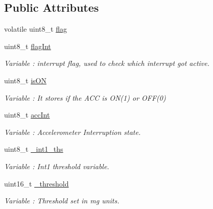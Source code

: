 \subsection*{Public Attributes}
\begin{DoxyCompactItemize}
\item 
volatile uint8\+\_\+t \hyperlink{class_wasp_a_c_c_a68bd866582dd3a6cffb18c806b22b5de}{flag}
\item 
uint8\+\_\+t \hyperlink{class_wasp_a_c_c_a6ce4e7806e8476ae6b71c93664676667}{flag\+Int}
\begin{DoxyCompactList}\small\item\em Variable \+: interrupt flag, used to check which interrupt got active. \end{DoxyCompactList}\item 
uint8\+\_\+t \hyperlink{class_wasp_a_c_c_a763559b5cce13e31413a28f69bf22abe}{is\+ON}\hypertarget{class_wasp_a_c_c_a763559b5cce13e31413a28f69bf22abe}{}\label{class_wasp_a_c_c_a763559b5cce13e31413a28f69bf22abe}

\begin{DoxyCompactList}\small\item\em Variable \+: It stores if the A\+CC is O\+N(1) or O\+F\+F(0) \end{DoxyCompactList}\item 
uint8\+\_\+t \hyperlink{class_wasp_a_c_c_adaaf55e90566fe60d0142cbd751c358f}{acc\+Int}
\begin{DoxyCompactList}\small\item\em Variable \+: Accelerometer Interruption state. \end{DoxyCompactList}\item 
uint8\+\_\+t \hyperlink{class_wasp_a_c_c_a78a11c8f00171fc654921f6fd6e563b8}{\+\_\+int1\+\_\+ths}
\begin{DoxyCompactList}\small\item\em Variable \+: Int1 threshold variable. \end{DoxyCompactList}\item 
uint16\+\_\+t \hyperlink{class_wasp_a_c_c_af40fced948ff84d39301e7886ae7449f}{\+\_\+threshold}\hypertarget{class_wasp_a_c_c_af40fced948ff84d39301e7886ae7449f}{}\label{class_wasp_a_c_c_af40fced948ff84d39301e7886ae7449f}

\begin{DoxyCompactList}\small\item\em Variable \+: Threshold set in mg units. \end{DoxyCompactList}\end{DoxyCompactItemize}


